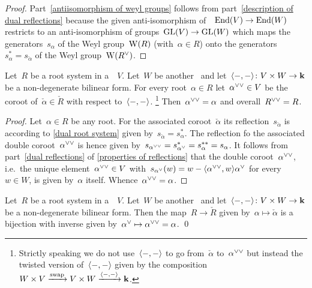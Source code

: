 \begin{proof}
  Part~\ref*{antiisomorphism of weyl groups} follows from part~\ref*{description of dual reflections} because the given anti-isomorphism of~{\algebras{$\kf$}}~$\operatorname{End}(V) \to \operatorname{End}(W)$ restricts to an anti-isomorphism of groups~$\operatorname{GL}(V) \to \operatorname{GL}(W)$ which maps the generators~$s_\alpha$ of the Weyl group~$\operatorname{W}(R)$ (with~$\alpha \in R$) onto the generators~$s_\alpha^* = s_{\check{\alpha}}$ of the Weyl group~$\Weyl(\check{R})$.
\end{proof}


\begin{lemma}
  \label{double duality of root systems}
  Let~$R$ be a root system in a~{\vectorspace{$\kf$}}~$V$.
  Let~$W$ be another~{\vectorspace{$\kf$}} and let~$\langle-,-\rangle \colon V \times W \to \mathbf{k}$ be a non-degenerate bilinear form.
  For every root~$\alpha \in R$ let~$\dcheck{\alpha} \in V$ be the coroot of~$\check{\alpha} \in \check{R}$ with respect to~$\langle-,-\rangle$.%
  \footnote{Strictly speaking we do not use~$\langle-,-\rangle$ to go from~$\check{\alpha}$ to~$\dcheck{\alpha}$ but instead the twisted version of~$\langle-,-\rangle$ given by the composition~$W \times V \xrightarrow{\text{swap}} V \times W \xrightarrow{\langle-,-\rangle} \mathbf{k}$.}
  Then~$\dcheck{\alpha} = \alpha$ and overall~$\dcheck{R} = R$.
\end{lemma}


\begin{proof}
  Let~$\alpha \in R$ be any root.
  For the associated coroot~$\check{\alpha}$ its reflection~$s_{\check{\alpha}}$ is according to \cref{dual root system} given by~$s_{\check{\alpha}} = s_\alpha^*$.
  The reflection fo the associated double coroot~$\dcheck{\alpha}$ is hence given by~$s_{\dcheck{\alpha}} = s_{\check{\alpha}}^* = s_\alpha^{**} = s_\alpha$.
  It follows from part~\ref*{dual reflections} of \cref{properties of reflections} that the double coroot~$\dcheck{\alpha}$, i.e.\ the unique element~$\dcheck{\alpha} \in V$ with~$s_{\check{\alpha}}(w) = w - \pair{\dcheck{\alpha}, w} \check{\alpha}$ for every~$w \in W$, is given by~$\alpha$ itself.
  Whence~$\dcheck{\alpha} = \alpha$.
\end{proof}


\begin{corollary}
  \label{root to dual root is bijective}
  Let~$R$ be a root system in a~{\vectorspace{$\kf$}}~$V$.
  Let~$W$ be another~{\vectorspace{$\kf$}} and let~$\langle-,-\rangle \colon V \times W \to \mathbf{k}$ be a non-degenerate bilinear form.
  Then the map~$R \to \check{R}$ given by~$\alpha \mapsto \check{\alpha}$ is a bijection with inverse given by~$\check{\alpha} \mapsto \dcheck{\alpha} = \alpha$.
  \qed
\end{corollary}


